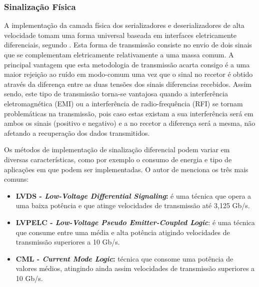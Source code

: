 \subsubsection*{Sinalização Física}


A implementação da camada física dos serializadores e deserializadores de alta velocidade tomam uma forma universal baseada em interfaces eletricamente diferenciais, segundo \cite{R032}. Esta forma de transmissão consiste no envio de dois sinais que se complementam eletricamente relativamente a uma massa comum. A principal vantagem que esta metodologia de transmissão acarta consigo é a uma maior rejeição ao ruído em modo-comum uma vez que o sinal no recetor é obtido através da diferença entre as duas tensões dos sinais diferencias recebidos. Assim sendo, este tipo de transmissão torna-se vantajosa quando a interferência eletromagnética (EMI) ou a interferência de radio-frequência (RFI) se tornam problemáticas na transmissão, pois caso estas existam a sua interferência será em ambos os sinais (positivo e negativo) e a no recetor a diferença será a mesma, não afetando a recuperação dos dados transmitidos.

Os métodos de implementação de sinalização diferencial podem variar em diversas características, como por exemplo o consumo de energia e tipo de aplicações em que podem ser implementadas. O autor de \cite{R032} menciona os três mais comuns:

\begin{itemize}
	\item \textbf{LVDS - \textit{Low-Voltage Differential Signaling}:} é uma técnica que opera a uma baixa potência e que atinge velocidades de transmissão até 3,125 Gb/s. 
	\item \textbf{LVPELC - \textit{Low-Voltage Pseudo Emitter-Coupled Logic}}: é uma técnica que consume entre uma média e alta potência atigindo velocidades de transmissão superiores a 10 Gb/s.
	\item \textbf{CML - \textit{Current Mode Logic}:} técnica que consome uma potência de valores médios, atingindo ainda assim velocidades de transmissão superiores a 10 Gb/s.
\end{itemize}

